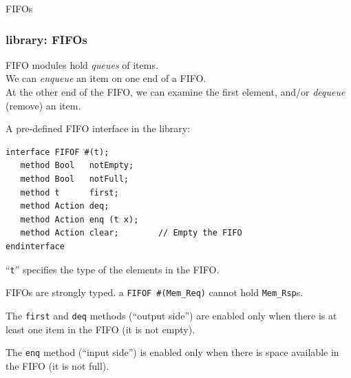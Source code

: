 
\begin{frame}

\begin{center}
  {\LARGE FIFOs}
\end{center}

\end{frame}


\begin{frame}[fragile]
\frametitle{{\BSV} library: FIFOs}

\footnotesize

FIFO modules hold \emph{queues} of items. \\
We can \emph{enqueue} an item on one end of a FIFO. \\
At the other end of the FIFO, we can examine the first element, and/or
\emph{dequeue} (remove) an item.

\PAUSE{\vspace{2ex}}

A pre-defined FIFO interface in the {\BSV} library:
\begin{Verbatim}[frame=single]
interface FIFOF #(t);
   method Bool   notEmpty;
   method Bool   notFull;
   method t      first;
   method Action deq;
   method Action enq (t x);
   method Action clear;        // Empty the FIFO
endinterface
\end{Verbatim}

``{\tt t}'' specifies the type of the elements in the FIFO.

{\BSV} FIFOs are strongly typed.  \hmmmm {\Eg} a \verb|FIFOF #(Mem_Req)| cannot hold \verb|Mem_Rsp|s.

\vspace{4ex}

The {\tt first} and {\tt deq} methods (``output side'') are enabled
only when there is at least one item in the FIFO (it is not empty).

\vspace{1ex}

The {\tt enq} method (``input side'') is enabled only when there is space
available in the FIFO (it is not full).

\end{frame}


